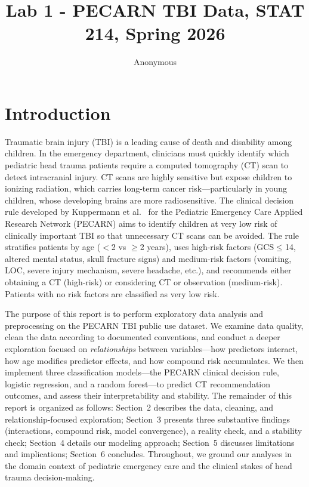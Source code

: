 \documentclass[12ptpt,letterpaper]{article}
\title{Lab 1 - PECARN TBI Data, STAT 214, Spring 2026}
\author{Anonymous}
\begin{document}
\maketitle



\section{Introduction}\label{introduction}

Traumatic brain injury (TBI) is a leading cause of death and disability among children. In the emergency department, clinicians must quickly identify which pediatric head trauma patients require a computed tomography (CT) scan to detect intracranial injury. CT scans are highly sensitive but expose children to ionizing radiation, which carries long-term cancer risk---particularly in young children, whose developing brains are more radiosensitive. The clinical decision rule developed by Kuppermann et al.\ \cite{kuppermann2009} for the Pediatric Emergency Care Applied Research Network (PECARN) aims to identify children at very low risk of clinically important TBI so that unnecessary CT scans can be avoided. The rule stratifies patients by age ($<$2 vs $\ge$2 years), uses high-risk factors (GCS$\le$14, altered mental status, skull fracture signs) and medium-risk factors (vomiting, LOC, severe injury mechanism, severe headache, etc.), and recommends either obtaining a CT (high-risk) or considering CT or observation (medium-risk). Patients with no risk factors are classified as very low risk.

The purpose of this report is to perform exploratory data analysis and preprocessing on the PECARN TBI public use dataset. We examine data quality, clean the data according to documented conventions, and conduct a deeper exploration focused on \emph{relationships} between variables---how predictors interact, how age modifies predictor effects, and how compound risk accumulates. We then implement three classification models---the PECARN clinical decision rule, logistic regression, and a random forest---to predict CT recommendation outcomes, and assess their interpretability and stability. The remainder of this report is organized as follows: Section~2 describes the data, cleaning, and relationship-focused exploration; Section~3 presents three substantive findings (interactions, compound risk, model convergence), a reality check, and a stability check; Section~4 details our modeling approach; Section~5 discusses limitations and implications; Section~6 concludes. Throughout, we ground our analyses in the domain context of pediatric emergency care and the clinical stakes of head trauma decision-making.
\end{document}
